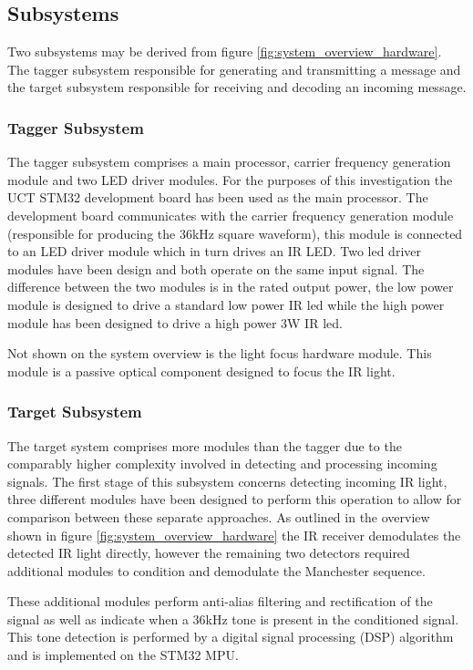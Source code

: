 \subsection{Subsystems}

Two subsystems may be derived from figure \ref{fig:system_overview_hardware}. The tagger subsystem responsible for generating and transmitting a message and the target subsystem responsible for receiving and decoding an incoming message.

\subsubsection{Tagger Subsystem}
The tagger subsystem comprises a main processor, carrier frequency generation module and two LED driver modules. For the purposes of this investigation the UCT STM32\footnotemark{} development board has been used as the main processor. The development board communicates with the carrier frequency generation module (responsible for producing the 36kHz square waveform), this module is connected to an LED driver module which in turn drives an IR LED. Two led driver modules have been design and both operate on the same input signal. The difference between the two modules is in the rated output power, the low power module is designed to drive a standard low power IR led while the high power module has been designed to drive a high power 3W IR led.

Not shown on the system overview is the light focus hardware module. This module is a passive optical component designed to focus the IR light.


\subsubsection{Target Subsystem}
The target system comprises more modules than the tagger due to the comparably higher complexity involved in detecting and processing incoming signals. The first stage of this subsystem concerns detecting incoming IR light, three different modules have been designed to perform this operation to allow for comparison between these separate approaches. As outlined in the overview shown in figure \ref{fig:system_overview_hardware} the IR receiver demodulates the detected IR light directly, however the remaining two detectors required additional modules to condition and demodulate the Manchester sequence.

These additional modules perform anti-alias filtering and rectification of the signal as well as indicate when a 36kHz tone is present in the conditioned signal. This tone detection is performed by a digital signal processing (DSP) algorithm and is implemented on the STM32 MPU.


